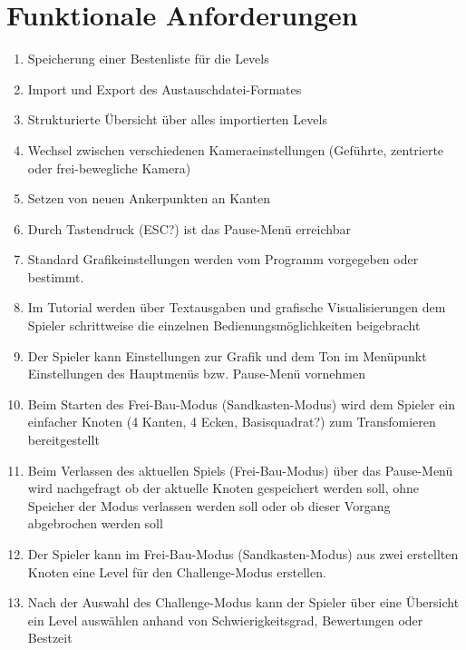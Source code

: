 \chapter{Funktionale Anforderungen}


\renewcommand{\theenumi}{/F\_\arabic{enumi}0/}
\renewcommand{\labelenumi}{\theenumi}

\begin{enumerate}

\item Speicherung einer Bestenliste für die Levels
\item Import und Export des Austauschdatei-Formates 
\item Strukturierte Übersicht über alles importierten Levels 
\item Wechsel zwischen verschiedenen Kameraeinstellungen (Geführte, zentrierte oder frei-bewegliche Kamera)  
\item Setzen von neuen Ankerpunkten an Kanten 
\item Durch Tastendruck (ESC?) ist das Pause-Menü erreichbar 
\item Standard Grafikeinstellungen werden vom Programm vorgegeben oder bestimmt. 
\item Im Tutorial werden über Textausgaben und grafische Visualisierungen dem Spieler schrittweise die einzelnen Bedienungsmöglichkeiten beigebracht 
\item Der Spieler kann Einstellungen zur Grafik und dem Ton im Menüpunkt Einstellungen des Hauptmenüs bzw. Pause-Menü vornehmen
\item Beim Starten des Frei-Bau-Modus (Sandkasten-Modus) wird dem Spieler ein einfacher Knoten (4 Kanten, 4 Ecken, Basisquadrat?) zum Transfomieren bereitgestellt
\item Beim Verlassen des aktuellen Spiels (Frei-Bau-Modus) über das Pause-Menü wird nachgefragt ob der aktuelle Knoten gespeichert werden soll, ohne Speicher der Modus verlassen werden soll oder ob dieser Vorgang abgebrochen werden soll %
\item Der Spieler kann im Frei-Bau-Modus (Sandkasten-Modus) aus zwei erstellten Knoten eine Level für den Challenge-Modus erstellen.
\item Nach der Auswahl des Challenge-Modus kann der Spieler über eine Übersicht ein Level auswählen anhand von Schwierigkeitsgrad, Bewertungen oder Bestzeit

\end{enumerate}
